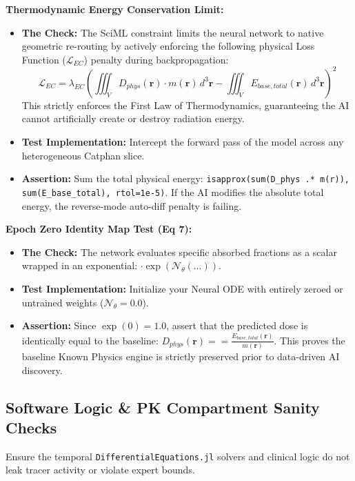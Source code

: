 \documentclass[11pt,a4paper]{article}
\begin{document}
\noindent\textbf{Thermodynamic Energy Conservation Limit:}
\begin{itemize}
    \item \textbf{The Check:} The SciML constraint limits the neural network to native geometric re-routing by actively enforcing the following physical Loss Function ($\mathcal{L}_{EC}$) penalty during backpropagation:
    \begin{equation}
        \mathcal{L}_{EC} = \lambda_{EC} \left( \iiint_V D_{phys}(\mathbf{r}) \cdot m(\mathbf{r}) \, d^3\mathbf{r} - \iiint_V E_{base,total}(\mathbf{r}) \, d^3\mathbf{r} \right)^2
    \end{equation}
    This strictly enforces the First Law of Thermodynamics, guaranteeing the AI cannot artificially create or destroy radiation energy.
    \item \textbf{Test Implementation:} Intercept the forward pass of the model across any heterogeneous Catphan slice.
    \item \textbf{Assertion:} Sum the total physical energy: \texttt{isapprox(sum(D\_phys .* m(r)), sum(E\_base\_total), rtol=1e-5)}. If the AI modifies the absolute total energy, the reverse-mode auto-diff penalty is failing.
\end{itemize}

\noindent\textbf{Epoch Zero Identity Map Test (Eq 7):}
\begin{itemize}
    \item \textbf{The Check:} The network evaluates specific absorbed fractions as a scalar wrapped in an exponential: $\cdot \exp(\mathcal{N}_\theta(\dots))$.
    \item \textbf{Test Implementation:} Initialize your Neural ODE with entirely zeroed or untrained weights ($\mathcal{N}_\theta = 0.0$).
    \item \textbf{Assertion:} Since $\exp(0) = 1.0$, assert that the predicted dose is identically equal to the baseline: $D_{phys}(\mathbf{r}) == \frac{E_{base,total}(\mathbf{r})}{m(\mathbf{r})}$. This proves the baseline Known Physics engine is strictly preserved prior to data-driven AI discovery.
\end{itemize}

\subsection{Software Logic \& PK Compartment Sanity Checks}
Ensure the temporal \texttt{DifferentialEquations.jl} solvers and clinical logic do not leak tracer activity or violate expert bounds.
\end{document}
